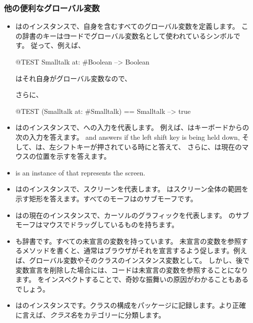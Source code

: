 \documentclass[a4paper,10pt,twoside]{book}
\begin{document}
\subsubsection{他の便利なグローバル変数}

\begin{itemize}
\item
{}はのインスタンスで、自身を含むすべてのグローバル変数を定義します。
この辞書のキーは\st コードでグローバル変数名として使われているシンボルです。
従って、例えば、
\begin{code}{@TEST}
Smalltalk at: #Boolean --> Boolean
\end{code}
はそれ自身がグローバル変数なので、
\begin{code}{}
Smalltalk at: #Smalltalk-->a SystemDictionary(lots of globals)}
\end{code} 
さらに、
\begin{code}{@TEST}
(Smalltalk at: #Smalltalk) == Smalltalk --> true
\end{code}

\item {}はのインスタンスで、\pharo への入力を代表します。
例えば、はキーボードからの次の入力を答えます。
 and  answers  if the left shift key is being held down,
そして、は、左シフトキーが押されている時にと答えて、
さらに、は現在のマウスの位置を示すを答えます。

\item {} is an instance of  that represents the screen.
\item {}はのインスタンスで、スクリーンを代表します。
はスクリーン全体の範囲を示す矩形を答えます。すべてのモーフはのサブモーフです。

\item 
{}はの現在のインスタンスで、カーソルのグラフィックを代表します。
のサブモーフはマウスでドラッグしているものを持ちます。

\item
{}も辞書です。すべての未宣言の変数を持っています。
未宣言の変数を参照するメソッドを書くと、通常はブラウザがそれを宣言するよう促します。例えば、グローバル変数やそのクラスのインスタンス変数として。
しかし、後で変数宣言を削除した場合には、コードは未宣言の変数を参照することになります。
をインスペクトすることで、奇妙な振舞いの原因がわかることもあるでしょう。

\item
{}はのインスタンスです。クラスの構成をパッケージに記録します。より正確に言えば、\emph{クラス名}をカテゴリーに分類します。
\end{itemize}
\end{document}
